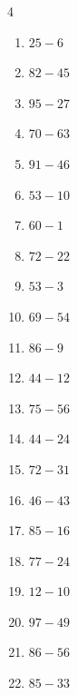 \begin{multicols}{4}
\begin{enumerate}
  \item $25-6$
        \phantom{$=19$}

  \item $82-45$
        \phantom{$=37$}

  \item $95-27$
        \phantom{$=68$}

  \item $70-63$
        \phantom{$=7$}

  \item $91-46$
        \phantom{$=45$}

  \item $53-10$
        \phantom{$=43$}

  \item $60-1$
        \phantom{$=59$}

  \item $72-22$
        \phantom{$=50$}

  \item $53-3$
        \phantom{$=50$}

  \item $69-54$
        \phantom{$=15$}

  \item $86-9$
        \phantom{$=77$}

  \item $44-12$
        \phantom{$=32$}

  \item $75-56$
        \phantom{$=19$}

  \item $44-24$
        \phantom{$=20$}

  \item $72-31$
        \phantom{$=41$}

  \item $46-43$
        \phantom{$=3$}

  \item $85-16$
        \phantom{$=69$}

  \item $77-24$
        \phantom{$=53$}

  \item $12-10$
        \phantom{$=2$}

\columnbreak %

  \item $97-49$
        \phantom{$=48$}

  \item $86-56$
        \phantom{$=30$}

  \item $85-33$
        \phantom{$=52$}


\end{enumerate}
\end{multicols}
